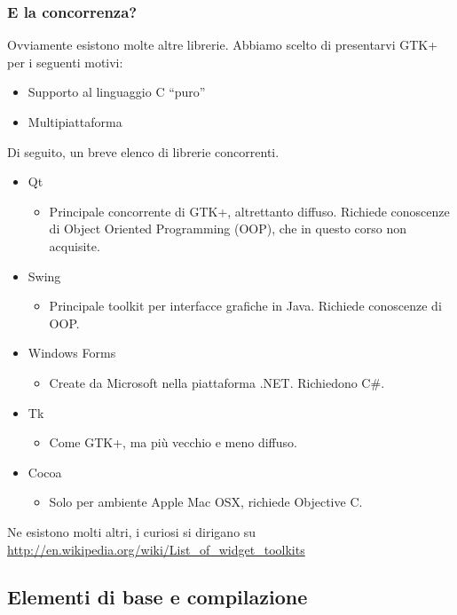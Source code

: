 \documentclass{beamer}
\begin{document}
\begin{frame}
\frametitle{E la concorrenza?}
Ovviamente esistono molte altre librerie. Abbiamo scelto di presentarvi GTK+ per i seguenti motivi:
\begin{itemize}
 \item Supporto al linguaggio C ``puro''
 \item Multipiattaforma
\end{itemize}

Di seguito, un breve elenco di librerie concorrenti.
\begin{itemize}
 \item Qt
 \begin{itemize}
  \footnotesize
  \item Principale concorrente di GTK+, altrettanto diffuso. Richiede conoscenze di Object Oriented Programming (OOP), che in questo corso non acquisite.
 \end{itemize}
 \item Swing
 \begin{itemize}
  \footnotesize
  \item Principale toolkit per interfacce grafiche in Java. Richiede conoscenze di OOP.
 \end{itemize}
 \item Windows Forms
 \begin{itemize}
  \footnotesize
  \item Create da Microsoft nella piattaforma .NET. Richiedono C\#.
 \end{itemize}
 \item Tk
 \begin{itemize}
  \footnotesize
  \item Come GTK+, ma più vecchio e meno diffuso.
 \end{itemize}
 \item Cocoa
 \begin{itemize}
  \footnotesize
  \item Solo per ambiente Apple Mac OSX, richiede Objective C.
 \end{itemize}
\end{itemize}
Ne esistono molti altri, i curiosi si dirigano su \url{http://en.wikipedia.org/wiki/List_of_widget_toolkits}
\end{frame}

\subsection{Elementi di base e compilazione}
\end{document}
